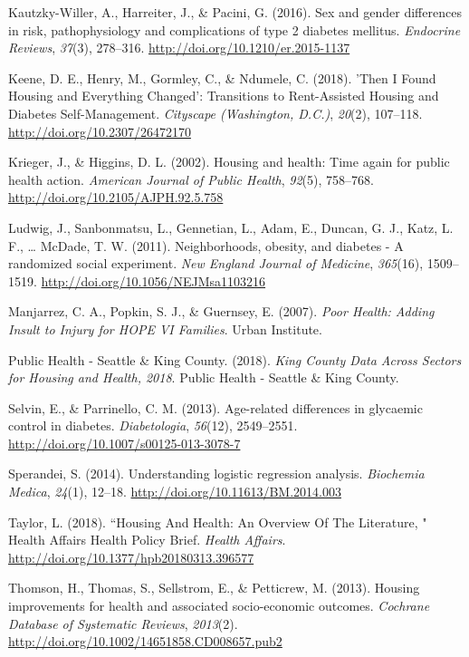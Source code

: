 \documentclass [11pt, proquest] {uwthesis}[2015/03/03]
\begin{document}
\hypertarget{ref-Kautzky-Willer2016}{}
Kautzky-Willer, A., Harreiter, J., \& Pacini, G. (2016). Sex and gender
differences in risk, pathophysiology and complications of type 2
diabetes mellitus. \emph{Endocrine Reviews}, \emph{37}(3), 278--316.
\url{http://doi.org/10.1210/er.2015-1137}

\hypertarget{ref-Keene2018}{}
Keene, D. E., Henry, M., Gormley, C., \& Ndumele, C. (2018). 'Then I
Found Housing and Everything Changed': Transitions to Rent-Assisted
Housing and Diabetes Self-Management. \emph{Cityscape (Washington,
D.C.)}, \emph{20}(2), 107--118. \url{http://doi.org/10.2307/26472170}

\hypertarget{ref-Krieger2002}{}
Krieger, J., \& Higgins, D. L. (2002). Housing and health: Time again
for public health action. \emph{American Journal of Public Health},
\emph{92}(5), 758--768. \url{http://doi.org/10.2105/AJPH.92.5.758}

\hypertarget{ref-Ludwig2011}{}
Ludwig, J., Sanbonmatsu, L., Gennetian, L., Adam, E., Duncan, G. J.,
Katz, L. F., \ldots{} McDade, T. W. (2011). Neighborhoods, obesity, and
diabetes - A randomized social experiment. \emph{New England Journal of
Medicine}, \emph{365}(16), 1509--1519.
\url{http://doi.org/10.1056/NEJMsa1103216}

\hypertarget{ref-Manjarrez2007}{}
Manjarrez, C. A., Popkin, S. J., \& Guernsey, E. (2007). \emph{Poor
Health: Adding Insult to Injury for HOPE VI Families}. Urban Institute.

\hypertarget{ref-PHSKC2018}{}
Public Health - Seattle \& King County. (2018). \emph{King County Data
Across Sectors for Housing and Health, 2018}. Public Health - Seattle \&
King County.

\hypertarget{ref-Selvin2013}{}
Selvin, E., \& Parrinello, C. M. (2013). Age-related differences in
glycaemic control in diabetes. \emph{Diabetologia}, \emph{56}(12),
2549--2551. \url{http://doi.org/10.1007/s00125-013-3078-7}

\hypertarget{ref-Sperandei2014}{}
Sperandei, S. (2014). Understanding logistic regression analysis.
\emph{Biochemia Medica}, \emph{24}(1), 12--18.
\url{http://doi.org/10.11613/BM.2014.003}

\hypertarget{ref-Taylor2018}{}
Taylor, L. (2018). ``Housing And Health: An Overview Of The Literature,
" Health Affairs Health Policy Brief. \emph{Health Affairs}.
\url{http://doi.org/10.1377/hpb20180313.396577}

\hypertarget{ref-Thomson2013}{}
Thomson, H., Thomas, S., Sellstrom, E., \& Petticrew, M. (2013). Housing
improvements for health and associated socio-economic outcomes.
\emph{Cochrane Database of Systematic Reviews}, \emph{2013}(2).
\url{http://doi.org/10.1002/14651858.CD008657.pub2}
\end{document}
